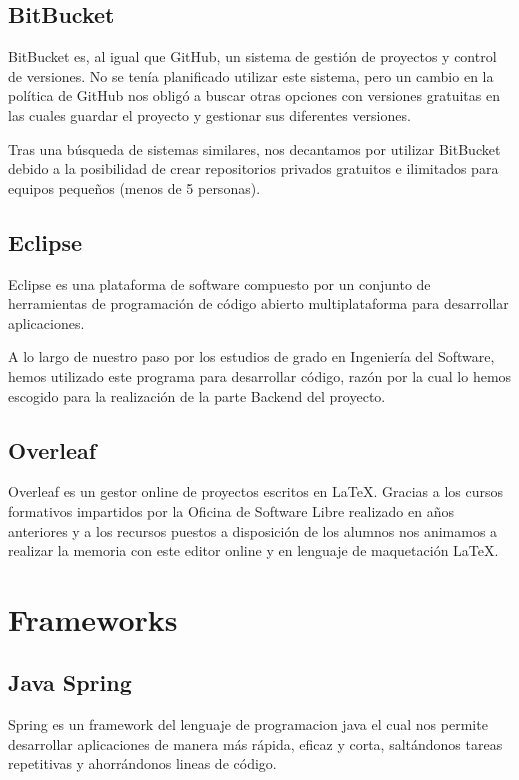      \subsection{BitBucket}
     BitBucket es, al igual que GitHub, un sistema de gestión de proyectos y control de versiones. No se tenía planificado utilizar este sistema, pero un cambio en la política de GitHub nos obligó a buscar otras opciones con versiones gratuitas en las cuales guardar el proyecto y gestionar sus diferentes versiones.
     \newline
     
     Tras una búsqueda de sistemas similares, nos decantamos por utilizar BitBucket debido a la posibilidad de crear repositorios privados gratuitos e ilimitados para equipos pequeños (menos de 5 personas).
     
     \subsection{Eclipse}
     Eclipse es una plataforma de software compuesto por un conjunto de herramientas de programación de código abierto multiplataforma para desarrollar aplicaciones\cite{eclipse}.
     \newline
     
     A lo largo de nuestro paso por los estudios de grado en Ingeniería del Software, hemos utilizado este programa para desarrollar código, razón por la cual lo hemos escogido para la realización de la parte Backend del proyecto.
     
     
     \subsection{Overleaf}
     Overleaf es un gestor online de proyectos escritos en \LaTeX. Gracias a los cursos formativos impartidos por la Oficina de Software Libre\cite{ucmsoftwarelibre} realizado en años anteriores y a los recursos puestos a disposición de los alumnos\cite{recursoslatex} nos animamos a realizar la memoria con este editor online y en lenguaje de maquetación \LaTeX.
     
     \section{Frameworks}
     
     \subsection{Java Spring}
     Spring es un framework del lenguaje de programacion java el cual nos permite desarrollar aplicaciones de manera más rápida, eficaz y corta, saltándonos tareas repetitivas y ahorrándonos lineas de código\cite{javaspring}.
     \newline
     
